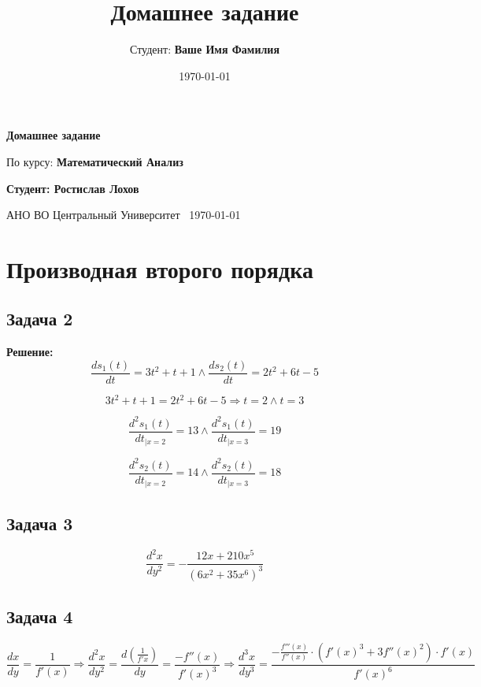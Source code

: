 \documentclass[a4paper,12pt]{article}
\title{Домашнее задание}
\author{Студент: \textbf{Ваше Имя Фамилия}}
\date{\today}
\begin{document}
\begin{titlepage}
    \centering
    \vspace*{1cm}

    \Huge
    \textbf{Домашнее задание}

    \vspace{0.5cm}
    \LARGE
    По курсу: \textbf{Математический Анализ}

    \vspace{1.5cm}

    \textbf{Студент: Ростислав Лохов}

    \vfill

    \Large
    АНО ВО Центральный Университет\
    \vspace{0.3cm}
    \today

\end{titlepage}

\tableofcontents
\newpage

\section{Производная второго порядка}

\subsection{Задача 2}
\textbf{Решение: }
\[
\frac{ds_1(t)}{dt} = 3t^2+t+1 \land \frac{ds_2(t)}{dt} = 2t^2+6t-5
\]

\[
3t^2+t+1 = 2t^2+6t-5 \Rightarrow t = 2 \land t = 3
\]

\[
\frac{d^2s_1(t)}{dt_{|x=2}} = 13 \land \frac{d^2s_1(t)}{dt_{|x=3}} = 19
\]

\[
\frac{d^2s_2(t)}{dt_{|x=2}} = 14 \land \frac{d^2s_2(t)}{dt_{|x=3}} = 18
\]

\subsection{Задача 3}
\[
\frac{d^2x}{dy^2} = -\frac{12x + 210x^5}{(6x^2+35x^6)^3}
\]

\subsection{Задача 4}
\[
\frac{dx}{dy} = \frac{1}{f'(x)} \Rightarrow \frac{d^2x}{dy^2} = \frac{d(\frac{1}{f'x})}{dy} = \frac{-f''(x)}{f'(x)^3} \Rightarrow \frac{d^3x}{dy^3} = \frac{-\frac{f'''(x)}{f''(x)}\cdot (f'(x)^3 + 3f''(x)^2) \cdot f'(x)}{f'(x)^6}
\]
\end{document}
